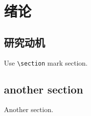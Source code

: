 \chapter{绪论}

\section{研究动机}
Use \verb|\section| mark section.

\section{another section}
Another section.